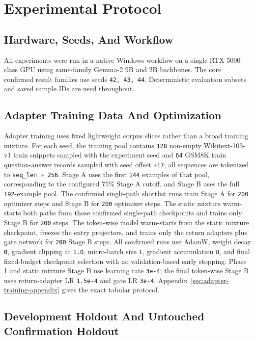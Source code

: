 \documentclass[11pt]{article}
\begin{document}
\section{Experimental Protocol}

\subsection{Hardware, Seeds, And Workflow}

All experiments were run in a native Windows workflow on a single RTX 5090-class GPU using same-family Gemma-2 9B and 2B backbones. The core confirmed result families use seeds \texttt{42, 43, 44}. Deterministic evaluation subsets and saved sample IDs are used throughout.

\subsection{Adapter Training Data And Optimization}

Adapter training uses fixed lightweight corpus slices rather than a broad training mixture. For each seed, the training pool contains \texttt{128} non-empty Wikitext-103-v1 train snippets sampled with the experiment seed and \texttt{64} GSM8K train question-answer records sampled with seed offset \texttt{+17}; all sequences are tokenized to \texttt{seq\_len = 256}. Stage A uses the first \texttt{144} examples of that pool, corresponding to the configured 75\% Stage A cutoff, and Stage B uses the full \texttt{192}-example pool. The confirmed single-path shortlist runs train Stage A for \texttt{200} optimizer steps and Stage B for \texttt{200} optimizer steps. The static mixture warm-starts both paths from those confirmed single-path checkpoints and trains only Stage B for \texttt{200} steps. The token-wise model warm-starts from the static mixture checkpoint, freezes the entry projectors, and trains only the return adapters plus gate network for \texttt{200} Stage B steps. All confirmed runs use AdamW, weight decay \texttt{0}, gradient clipping at \texttt{1.0}, micro-batch size \texttt{1}, gradient accumulation \texttt{8}, and final fixed-budget checkpoint selection with no validation-based early stopping. Phase 1 and static mixture Stage B use learning rate \texttt{3e-4}; the final token-wise Stage B uses return-adapter LR \texttt{1.5e-4} and gate LR \texttt{3e-4}. Appendix~\ref{sec:adapter-training-appendix} gives the exact tabular protocol.

\subsection{Development Holdout And Untouched Confirmation Holdout}
\end{document}

